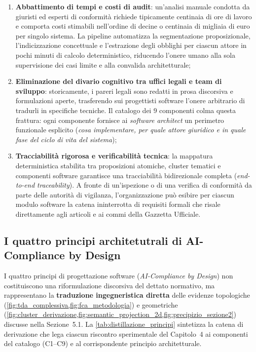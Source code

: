 \documentclass[12pt,a4paper,oneside]{report}
\begin{document}
\begin{enumerate}
  \item \textbf{Abbattimento di tempi e costi di audit}: un'analisi manuale condotta da giuristi ed esperti di conformità richiede tipicamente centinaia di ore di lavoro e comporta costi stimabili nell'ordine di decine o centinaia di migliaia di euro per singolo sistema. La pipeline automatizza la segmentazione proposizionale, l'indicizzazione concettuale e l'estrazione degli obblighi per ciascun attore in pochi minuti di calcolo deterministico, riducendo l'onere umano alla sola supervisione dei casi limite e alla convalida architetturale;
  
  \item \textbf{Eliminazione del divario cognitivo tra uffici legali e team di sviluppo}: storicamente, i pareri legali sono redatti in prosa discorsiva e formulazioni aperte, trasferendo sui progettisti software l'onere arbitrario di tradurli in specifiche tecniche. Il catalogo dei 9 componenti colma questa frattura: ogni componente fornisce ai \emph{software architect} un perimetro funzionale esplicito (\emph{cosa implementare, per quale attore giuridico e in quale fase del ciclo di vita del sistema});
  
  \item \textbf{Tracciabilità rigorosa e verificabilità tecnica}: la mappatura deterministica stabilita tra proposizioni atomiche, cluster tematici e componenti software garantisce una tracciabilità bidirezionale completa (\emph{end-to-end traceability}). A fronte di un'ispezione o di una verifica di conformità da parte delle autorità di vigilanza, l'organizzazione può esibire per ciascun modulo software la catena ininterrotta di requisiti formali che risale direttamente agli articoli e ai commi della Gazzetta Ufficiale.
\end{enumerate}

\subsection{I quattro principi architetutrali di AI-Compliance by Design}
I quattro principi di progettazione software (\emph{AI-Compliance by Design}) non costituiscono una riformulazione discorsiva del dettato normativo, ma rappresentano la \textbf{traduzione ingegneristica diretta} delle evidenze topologiche (\cref{fig:tda_complessiva,fig:fca_metodologia}) e geometriche (\cref{fig:cluster_derivazione,fig:semantic_projection_2d,fig:precipizio_sezione2}) discusse nella Sezione~5.1. La \cref{tab:distillazione_principi} sintetizza la catena di derivazione che lega ciascun riscontro sperimentale del Capitolo~4 ai componenti del catalogo (C1--C9) e al corrispondente principio architetturale.
\end{document}
